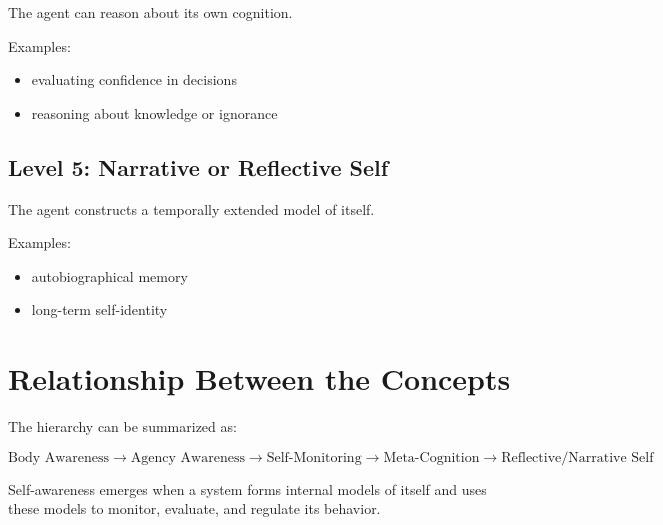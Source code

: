 \documentclass{article}
\begin{document}
            The agent can reason about its own cognition.
            
            Examples:
            
            \begin{itemize}
                \item evaluating confidence in decisions
                \item reasoning about knowledge or ignorance
            \end{itemize}
        
        \subsection{Level 5: Narrative or Reflective Self}
            
            The agent constructs a temporally extended model of itself.
            
            Examples:
            
            \begin{itemize}
                \item autobiographical memory
                \item long-term self-identity
            \end{itemize}
    
    
    \section{Relationship Between the Concepts}
        
        The hierarchy can be summarized as:
        
        \[
            \text{Body Awareness}
            \rightarrow
            \text{Agency Awareness}
            \rightarrow
            \text{Self-Monitoring}
            \rightarrow
            \text{Meta-Cognition}
            \rightarrow
            \text{Reflective/Narrative Self}
        \]
        
        Self-awareness emerges when a system forms internal models of itself and uses these models to monitor, evaluate, and regulate its behavior.
\end{document}
